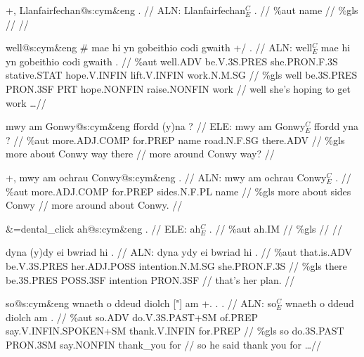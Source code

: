 \documentclass[a4paper,10pt]{article}
\begin{document}
\ex
\begingl[lingstyle=gergl]
\glchat +, Llanfairfechan@s:cym\&eng . //
\glsurface ALN:  Llanfairfechan$^{C}_{E}$ .  //
\glauto \%aut  name   //
\glmanual \%gls     //
\gleng  //
\endgl
\xe

\ex
\begingl[lingstyle=gergl]
\glchat well@s:cym\&eng \# mae hi yn gobeithio codi gwaith +/ . //
\glsurface ALN:  well$^{C}_{E}$ mae hi yn gobeithio codi gwaith .  //
\glauto \%aut  well{\scriptsize .ADV} be{\scriptsize .V.3S.PRES} she{\scriptsize .PRON.F.3S} stative{\scriptsize .STAT} hope{\scriptsize .V.INFIN} lift{\scriptsize .V.INFIN} work{\scriptsize .N.M.SG}   //
\glmanual \%gls  well be{\scriptsize .3S.PRES} PRON{\scriptsize .3SF} PRT hope{\scriptsize .NONFIN} raise{\scriptsize .NONFIN} work   //
\gleng well she's hoping to get work \dots  //
\endgl
\xe

\ex
\begingl[lingstyle=gergl]
\glchat mwy am Gonwy@s:cym\&eng ffordd (y)na ? //
\glsurface ELE:  mwy am Gonwy$^{C}_{E}$ ffordd yna ?  //
\glauto \%aut  more{\scriptsize .ADJ.COMP} for{\scriptsize .PREP} name road{\scriptsize .N.F.SG} there{\scriptsize .ADV}   //
\glmanual \%gls  more about Conwy way there   //
\gleng more around Conwy way? //
\endgl
\xe

\ex
\begingl[lingstyle=gergl]
\glchat +, mwy am ochrau Conwy@s:cym\&eng . //
\glsurface ALN:  mwy am ochrau Conwy$^{C}_{E}$ .  //
\glauto \%aut  more{\scriptsize .ADJ.COMP} for{\scriptsize .PREP} sides{\scriptsize .N.F.PL} name   //
\glmanual \%gls  more about sides Conwy   //
\gleng more around about Conwy. //
\endgl
\xe

\ex
\begingl[lingstyle=gergl]
\glchat \&=dental\_click ah@s:cym\&eng . //
\glsurface ELE:  ah$^{C}_{E}$ .  //
\glauto \%aut  ah{\scriptsize .IM}   //
\glmanual \%gls     //
\gleng  //
\endgl
\xe

\ex
\begingl[lingstyle=gergl]
\glchat dyna (y)dy ei bwriad hi . //
\glsurface ALN:  dyna ydy ei bwriad hi .  //
\glauto \%aut  that{\scriptsize .is.ADV} be{\scriptsize .V.3S.PRES} her{\scriptsize .ADJ.POSS} intention{\scriptsize .N.M.SG} she{\scriptsize .PRON.F.3S}   //
\glmanual \%gls  there be{\scriptsize .3S.PRES} POSS{\scriptsize .3SF} intention PRON{\scriptsize .3SF}   //
\gleng that's her plan. //
\endgl
\xe

\ex
\begingl[lingstyle=gergl]
\glchat so@s:cym\&eng wnaeth o ddeud diolch ["] am +. . . //
\glsurface ALN:  so$^{C}_{E}$ wnaeth o ddeud diolch am .  //
\glauto \%aut  so{\scriptsize .ADV} do{\scriptsize .V.3S.PAST+SM} of{\scriptsize .PREP} say{\scriptsize .V.INFIN.SPOKEN+SM} thank{\scriptsize .V.INFIN} for{\scriptsize .PREP}   //
\glmanual \%gls  so do{\scriptsize .3S.PAST} PRON{\scriptsize .3SM} say{\scriptsize .NONFIN} thank\_you for   //
\gleng so he said thank you for \dots  //
\endgl
\xe
\end{document}
